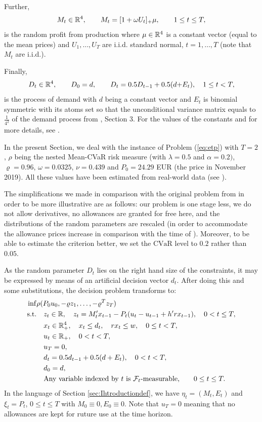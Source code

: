 \documentclass{article}              %
\begin{document}
Further,
\[
M_{t}\in \mathbb{R}^4,\qquad M_{t}=[1+ \omega U_{t}]_{+}\mu,\qquad1\leq t\leq T,
\]
is the random profit from production where $\mu\in\mathbb{R}^{4}$ is a
constant vector (equal to the mean prices) and $U_1,\dots,U_T$ are i.i.d. standard normal, $t=1,\dots,T$ (note that $M_t$ are i.i.d.).

Finally,
\[
D_{t}\in \mathbb{R}^4,\qquad D_{0}=d,\qquad D_{t}=0.5D_{t-1}+0.5(d\text{+\ensuremath{E_{t})}},\quad1\leq t<T,
\]
is the process of demand with $d$ being a
constant vector and $E_{t}$ is binomial symmetric with its atoms set so that the
unconditional variance matrix equals to $\frac{1}{4^2}$ of the demand process from \cite{zapletal2019multi}, Section 3. For the values of the constants and for more details, see \cite{zapletal2019multi}. 

In the present Section, we deal with the instance of Problem (\ref{eq:etp}) with  $T=2$, $\rho$ being the nested Mean-CVaR risk measure (with $\lambda=0.5$
and $\alpha=0.2)$,  $\varrho=0.96$, 
$\omega = 0.0325$, $\nu=0.439$ and $P_{0}=24.29$ EUR (the price
in November 2019). All these values have been estimated from real-world data (see \cite{zapletal2019multi}).

The simplifications we made in comparison with the original problem from \cite{zapletal2019multi} in order to be more illustrative are as follows: our problem is one stage less, we do not allow derivatives, no allowances are granted for free here, and the distributions of the random parameters are rescaled (in order to accommodate the allowance prices increase in comparison with the time of \cite{zapletal2019multi}). Moreover, to be able to estimate the criterion better, we set the $\mathrm{CVaR}$ level to $0.2$ rather than $0.05$. 

As the random parameter $D_{t}$ lies on the right hand size of the
constraints, it may be expressed by means of an artificial decision vector
$d_{t}$. After doing this and some substitutions, the decision problem
transforms to: 
\begin{align*}
\inf & \rho(P_{0}u_{0},-\varrho z_{1},\dots,-\varrho^{T}z_{T})\\
\text{s.t.} &\quad  z_{t}\in \mathbb{R},\quad  z_{t}=M'_{t}x_{t-1}-P_{t}(u_t-u_{t-1}+h'rx_{t-1}),\quad  0<t\leq T,\\
 &\quad  x_{t}\in\mathbb{R}_{+}^{4},\quad  x_{t}\leq d_{t},\quad  rx_{t}\leq w,\quad  0\leq t<T,\\
 &\quad  u_{t}\in\mathbb{R}_{+},\quad  0<t<T,\\
 &\quad  u_{T}=0,\\
 &\quad  d_{t}=0.5d_{t-1}+0.5(d+E_{t}),\quad  0<t<T,\\
 &\quad  d_{0}=d,\nonumber\\
 &\quad \text{Any variable indexed by $t$ is $\mathcal{F}_t$-measurable,}\qquad 0\leq t\leq T. \nonumber 
\end{align*}
In the language of Section \ref{sec:Ihtroductiondef}, we have $\eta_{t}=(M_{t},E_{t})$
and $\xi_{t}=P_{t}$, $0\leq t\leq T$ with $M_{0}\equiv0,$$E_{0}\equiv0$. Note that $u_T=0$ meaning that no allowances are kept for ruture use at the time horizon.
\end{document}
